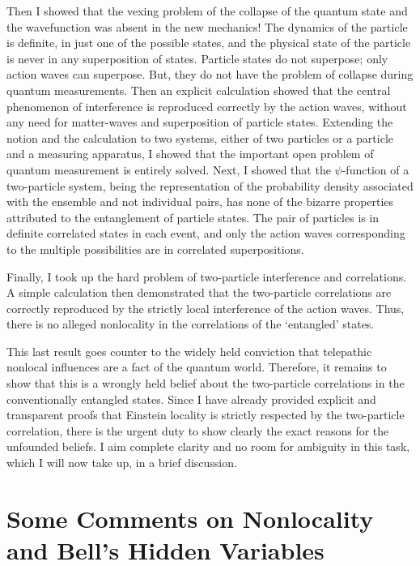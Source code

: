 Then I showed that the vexing problem of the collapse of the quantum state and the
wavefunction was absent in the new mechanics! The dynamics of the particle is definite, in
just one of the possible states, and the physical state of the particle is never in any superposition of states. Particle states do not superpose; only action waves can superpose. But, they do not have the problem of collapse during quantum measurements. Then an explicit
calculation showed that the central phenomenon of interference is reproduced correctly by
the action waves, without any need for matter-waves and superposition of particle states.
Extending the notion and the calculation to two systems, either of two particles or a particle and a measuring apparatus, I showed that the important open problem of quantum
measurement is entirely solved. Next, I showed that the $\psi$-function of a two-particle system, being the representation of the probability density associated with the ensemble and not individual pairs, has none of the bizarre properties attributed to the entanglement of
particle states. The pair of particles is in definite correlated states in each event, and only
the action waves corresponding to the multiple possibilities are in correlated superpositions.

Finally, I took up the hard problem of two-particle interference and correlations. A simple
calculation then demonstrated that the two-particle correlations are correctly reproduced by
the strictly local interference of the action waves. Thus, there is no alleged nonlocality in
the correlations of the `entangled' states.

This last result goes counter to the widely held conviction that telepathic nonlocal influences are a fact of the quantum world. Therefore, it remains to show that this is a wrongly held belief about the two-particle correlations in the conventionally entangled states. Since I have already provided explicit and transparent proofs that Einstein locality is strictly respected by the two-particle correlation, there is the urgent duty to show clearly the exact reasons for the unfounded beliefs. I aim complete clarity and no room for ambiguity in this task, which I will now take up, in a brief discussion.

\section{Some Comments on Nonlocality and Bell's Hidden Variables}\label{c14-sec9}


